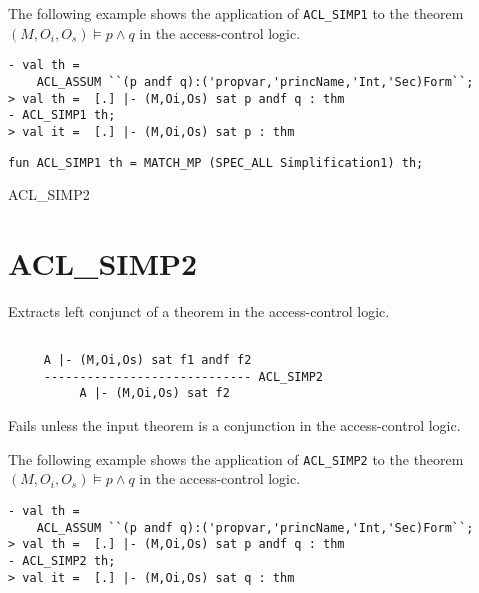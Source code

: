 \EXAMPLE The following example shows the application of
\texttt{ACL\_SIMP1} to the theorem $(M,O_i,O_s) \models p \wedge q$ in
the access-control logic.
\begin{holboxed}
\begin{verbatim}
- val th = 
    ACL_ASSUM ``(p andf q):('propvar,'princName,'Int,'Sec)Form``;
> val th =  [.] |- (M,Oi,Os) sat p andf q : thm
- ACL_SIMP1 th;
> val it =  [.] |- (M,Oi,Os) sat p : thm
\end{verbatim}
\end{holboxed}

\IMPLEMENTATION
\begin{holboxed}
\begin{verbatim}
fun ACL_SIMP1 th = MATCH_MP (SPEC_ALL Simplification1) th;
\end{verbatim}
\end{holboxed}

\SEEALSO
ACL\_SIMP2
\ENDDOC

\section{ACL\_SIMP2}



\egroup


\SYNOPSIS
Extracts left conjunct of a theorem in the access-control logic.

\DESCRIBE
\begin{verbatim}

     A |- (M,Oi,Os) sat f1 andf f2
     ----------------------------- ACL_SIMP2
          A |- (M,Oi,Os) sat f2
\end{verbatim}

\FAILURE
Fails unless the input theorem is a conjunction in the
access-control logic.

\EXAMPLE The following example shows the application of
\texttt{ACL\_SIMP2} to the theorem $(M,O_i,O_s) \models p \wedge q$ in
the access-control logic.
\begin{holboxed}
\begin{verbatim}
- val th = 
    ACL_ASSUM ``(p andf q):('propvar,'princName,'Int,'Sec)Form``;
> val th =  [.] |- (M,Oi,Os) sat p andf q : thm
- ACL_SIMP2 th;
> val it =  [.] |- (M,Oi,Os) sat q : thm
\end{verbatim}
\end{holboxed}

